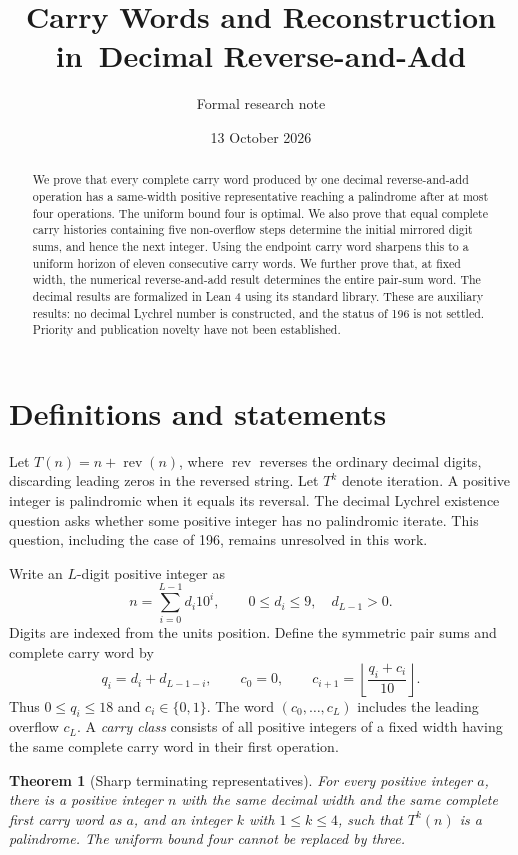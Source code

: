 \documentclass[11pt]{article}
\title{Carry Words and Reconstruction in\ Decimal Reverse-and-Add}
\author{Formal research note}
\date{13 October 2026}
\newtheorem{theorem}{Theorem}
\newcommand{\rev}{\operatorname{rev}}
\begin{document}
\maketitle
\begin{abstract}
We prove that every complete carry word produced by one decimal
reverse-and-add operation has a same-width positive representative reaching
a palindrome after at most four operations. The uniform bound four is
optimal. We also prove that equal complete carry histories containing five
non-overflow steps determine the initial mirrored digit sums, and hence the
next integer. Using the endpoint carry word sharpens this to a uniform
horizon of eleven consecutive carry words. We further prove that, at fixed
width, the numerical reverse-and-add result determines the entire pair-sum
word. The decimal results are formalized in Lean 4 using its
standard library. These are auxiliary results: no decimal Lychrel number is
constructed, and the status of 196 is not settled. Priority and publication
novelty have not been established.
\end{abstract}

\section{Definitions and statements}
Let $T(n)=n+\rev(n)$, where $\rev$ reverses the ordinary decimal digits,
discarding leading zeros in the reversed string. Let $T^k$ denote iteration.
A positive integer is palindromic when it equals its reversal.
The decimal Lychrel existence question asks whether some positive integer
has no palindromic iterate. This question, including the case of 196, remains
unresolved in this work.

Write an $L$-digit positive integer as
\[
 n=\sum_{i=0}^{L-1}d_i10^i,\qquad
 0\leq d_i\leq9,\quad d_{L-1}>0.
\]
Digits are indexed from the units position. Define the symmetric pair sums
and complete carry word by
\[
 q_i=d_i+d_{L-1-i},\qquad
 c_0=0,\qquad c_{i+1}=\left\lfloor\frac{q_i+c_i}{10}\right\rfloor.
\]
Thus $0\leq q_i\leq18$ and $c_i\in\{0,1\}$. The word
$(c_0,\ldots,c_L)$ includes the leading overflow $c_L$. A \emph{carry class}
consists of all positive integers of a fixed width having the same complete
carry word in their first operation.

\begin{theorem}[Sharp terminating representatives]\label{thm:four}
For every positive integer $a$, there is a positive integer $n$ with the
same decimal width and the same complete first carry word as $a$, and an
integer $k$ with $1\leq k\leq4$, such that $T^k(n)$ is a palindrome.
The uniform bound four cannot be replaced by three.
\end{theorem}
\end{document}
